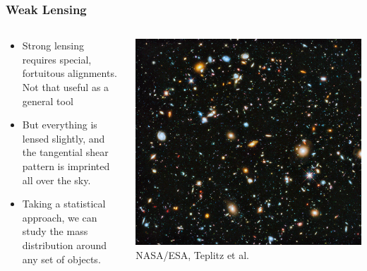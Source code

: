 \documentclass{beamer}
\begin{document}
\frame
{
    \frametitle{Weak Lensing}

    \begin{columns}
        \begin{column}{0.5\textwidth}    
            \begin{itemize}

                \item Strong lensing requires special, fortuitous alignments.
                    Not that useful as a general tool

                \item But everything is lensed slightly, and the {\color{gold} tangential shear}
                    pattern is imprinted all over the sky.

                \item Taking a statistical approach, we can study the mass
                    distribution around any set of objects.

            \end{itemize}
        \end{column}
        \begin{column}{0.5\textwidth}
            \begin{center}
                \includegraphics[width=\textwidth]{hubble-ultra-deep.jpg}
                \newline
                {\tiny  NASA/ESA, Teplitz et al.}
            \end{center}
        \end{column}
    \end{columns}
}
\end{document}
